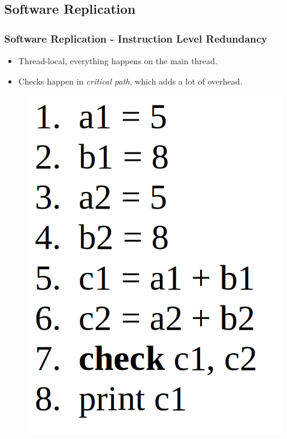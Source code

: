 \documentclass[xcolor=pdftex,dvipsnames,table]{beamer}
\begin{document}
\subsection{Software Replication}

\begin{frame}
	\frametitle{Software Replication - Instruction Level Redundancy}
    
    \begin{itemize}
    	\item Thread-local, everything happens on the main thread.  
        \item Checks happen in \textit{critical path}, which adds a lot of overhead. 
    \end{itemize}
    
          \begin{figure}[H]
            \begin{center}
                \includegraphics[scale=0.2]{ILR-Code.png}
            \end{center}
        \end{figure}
    
\end{frame}
\end{document}
